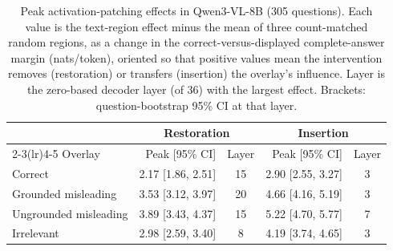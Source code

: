 \begin{table}[t]
\centering
\small
\setlength{\tabcolsep}{4pt}
\begin{tabular}{lrcrc}
\toprule
 & \multicolumn{2}{c}{Restoration} & \multicolumn{2}{c}{Insertion} \\
\cmidrule(lr){2-3}\cmidrule(lr){4-5}
Overlay & Peak [95\% CI] & Layer & Peak [95\% CI] & Layer \\
\midrule
Correct & 2.17 [1.86, 2.51] & 15 & 2.90 [2.55, 3.27] & 3 \\
Grounded misleading & 3.53 [3.12, 3.97] & 20 & 4.66 [4.16, 5.19] & 3 \\
Ungrounded misleading & 3.89 [3.43, 4.37] & 15 & 5.22 [4.70, 5.77] & 7 \\
Irrelevant & 2.98 [2.59, 3.40] & 8 & 4.19 [3.74, 4.65] & 3 \\
\bottomrule
\end{tabular}
\caption{Peak activation-patching effects in Qwen3-VL-8B (305 questions). Each value is the text-region effect minus the mean of three count-matched random regions, as a change in the correct-versus-displayed complete-answer margin (nats/token), oriented so that positive values mean the intervention removes (restoration) or transfers (insertion) the overlay's influence. Layer is the zero-based decoder layer (of 36) with the largest effect. Brackets: question-bootstrap 95\% CI at that layer.}
\label{tab:activation-peaks}
\end{table}
